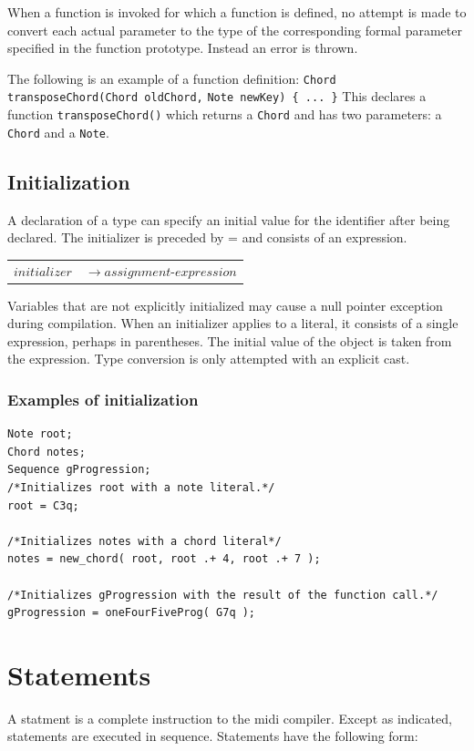 \documentclass[12pt,A4]{book}
\begin{document}
When a function is invoked for which a function is defined, no attempt is made to convert each actual parameter to the type of the corresponding formal parameter specified in the function prototype. Instead an error is thrown.  

The following is an example of a function definition:
\verb|Chord transposeChord(Chord oldChord,| \verb|Note newKey) { ... }|
This declares a function \verb|transposeChord()| which returns a \verb|Chord| and has two parameters: a \verb|Chord| and a \verb|Note|.  
\subsection{Initialization}
A declaration of a type can specify an initial value for the identifier after being declared.  The initializer is preceded by = and consists of an expression.

\begin{tabular}{l l}
$initializer$ & $\rightarrow assignment\mbox{-}expression$\\
\end{tabular}

Variables that are not explicitly initialized may cause a null pointer exception during compilation. When an initializer applies to a literal, it consists of a single expression, perhaps in parentheses.  The initial value of the object is taken from the expression.  Type conversion is only attempted with an explicit cast.

\subsubsection{Examples of initialization}
\begin{verbatim}
Note root;
Chord notes;
Sequence gProgression;
/*Initializes root with a note literal.*/
root = C3q;

/*Initializes notes with a chord literal*/
notes = new_chord( root, root .+ 4, root .+ 7 );

/*Initializes gProgression with the result of the function call.*/
gProgression = oneFourFiveProg( G7q );
\end{verbatim}
\section{Statements}
A statment is a complete instruction to the midi compiler. Except as indicated, statements are executed in sequence.  Statements have the following form:
\end{document}
